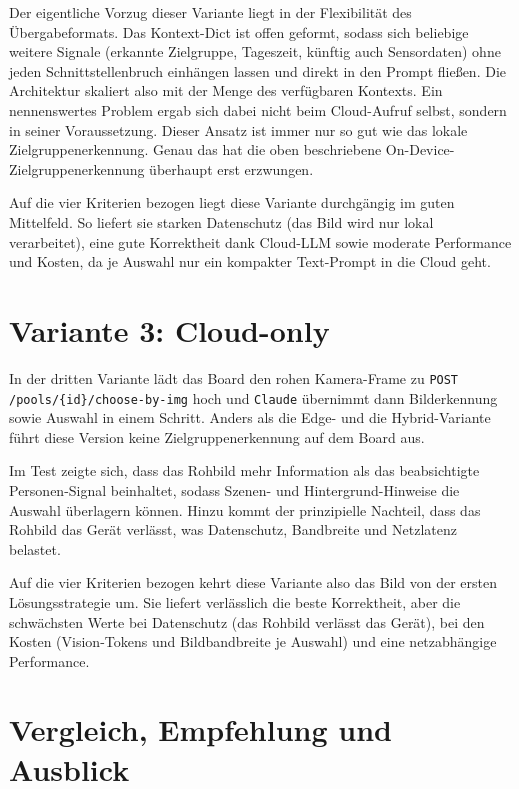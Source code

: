 \documentclass[a4paper, 12pt]{article}
\begin{document}
Der eigentliche Vorzug dieser Variante liegt in der Flexibilität des Übergabeformats. Das Kontext-Dict ist offen geformt, sodass sich beliebige weitere Signale (erkannte Zielgruppe, Tageszeit, künftig auch Sensordaten) ohne jeden Schnittstellenbruch einhängen lassen und direkt in den Prompt fließen. Die Architektur skaliert also mit der Menge des verfügbaren Kontexts. Ein nennenswertes Problem ergab sich dabei nicht beim Cloud-Aufruf selbst, sondern in seiner Voraussetzung. Dieser Ansatz ist immer nur so gut wie das lokale Zielgruppenerkennung. Genau das hat die oben beschriebene On-Device-Zielgruppenerkennung überhaupt erst erzwungen. 

Auf die vier Kriterien bezogen liegt diese Variante durchgängig im guten Mittelfeld. So liefert sie starken Datenschutz (das Bild wird nur lokal verarbeitet), eine gute Korrektheit dank Cloud-LLM sowie moderate Performance und Kosten, da je Auswahl nur ein kompakter Text-Prompt in die Cloud geht.

\section*{Variante 3: Cloud-only}
In der dritten Variante lädt das Board den rohen Kamera-Frame zu \texttt{POST /pools/\{id\}/\allowbreak choose-by-img} hoch und \texttt{Claude} übernimmt dann Bilderkennung sowie Auswahl in einem Schritt. Anders als die Edge- und die Hybrid-Variante führt diese Version keine Zielgruppenerkennung auf dem Board aus.

Im Test zeigte sich, dass das Rohbild mehr Information als das beabsichtigte Personen-Signal beinhaltet, sodass Szenen- und Hintergrund-Hinweise die Auswahl überlagern können. Hinzu kommt der prinzipielle Nachteil, dass das Rohbild das Gerät verlässt, was Datenschutz, Bandbreite und Netzlatenz belastet. 

Auf die vier Kriterien bezogen kehrt diese Variante also das Bild von der ersten Lösungsstrategie um. Sie liefert verlässlich die beste Korrektheit, aber die schwächsten Werte bei Datenschutz (das Rohbild verlässt das Gerät), bei den Kosten (Vision-Tokens und Bildbandbreite je Auswahl) und eine netzabhängige Performance.

\section*{Vergleich, Empfehlung und Ausblick}
\end{document}
